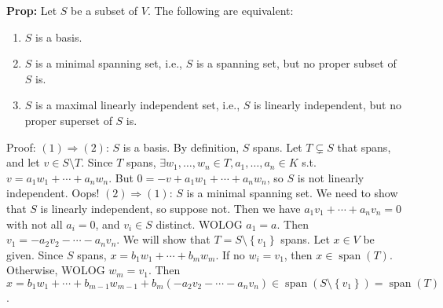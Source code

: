 \documentclass[10pt,letterpaper]{article}
\newcommand{\n}{\hfill\break}
\newcommand{\up}{\vspace{-\baselineskip}}
\newcommand{\hangblock}[2]{\par\noindent\settowidth{\hangindent}{\textbf{#1: }}\textbf{#1: }\!\!\!#2}
\newcommand{\prop}[1]{\hangblock{Prop}{#1}}
\newcommand{\set}[1]{\left\{#1\right\}}
\newcommand{\cut}{\setminus}
\DeclareMathOperator{\vspan}{span}
\newcommand{\st}{s.t.}
\begin{document}
\newpage
\prop{
	Let $S$ be a subset of $V$. The following are equivalent:
	\begin{enumerate}
		\item $S$ is a basis.
		\item $S$ is a minimal spanning set, i.e., $S$ is a spanning set, but no proper subset of $S$ is.
		\item $S$ is a maximal linearly independent set, i.e., $S$ is linearly independent, but no proper superset of $S$ is.
	\end{enumerate}\up\n
	Proof:\n
	$(1)\Rightarrow(2)$: $S$ is a basis. By definition, $S$ spans. Let $T\subsetneq{}S$ that spans, and let $v\in{}S\cut{}T$. Since $T$ spans, $\exists{}w_{1},\ldots,w_{n}\in{}T,a_{1},\ldots,a_{n}\in{}K$ \st{} $v=a_{1}w_{1}+\cdots+a_{n}w_{n}$. But $0=-v+a_{1}w_{1}+\cdots+a_{n}w_{n}$, so $S$ is not linearly independent. Oops!\n
	\n
	$(2)\Rightarrow(1)$: $S$ is a minimal spanning set. We need to show that $S$ is linearly independent, so suppose not. Then we have $a_{1}v_{1}+\cdots+a_{n}v_{n}=0$ with not all $a_{i}=0$, and $v_{i}\in{}S$ distinct. WOLOG $a_{1}=a$. Then $v_{1}=-a_{2}v_{2}-\cdots-a_{n}v_{n}$. We will show that $T=S\cut\set{v_{1}}$ spans.\n
	Let $x\in{}V$ be given. Since $S$ spans, $x=b_{1}w_{1}+\cdots+b_{m}w_{m}$. If no $w_{i}=v_{1}$, then $x\in\vspan(T)$. Otherwise, WOLOG $w_{m}=v_{1}$. Then\n
	$x=b_{1}w_{1}+\cdots+b_{m-1}w_{m-1}+b_{m}(-a_{2}v_{2}-\cdots-a_{n}v_{n})\in\vspan(S\cut\set{v_{1}})=\vspan(T)$.
}
\end{document}

